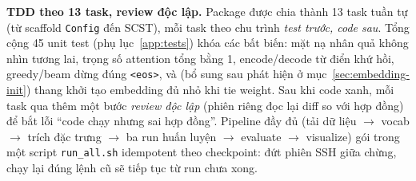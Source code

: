 \textbf{TDD theo 13 task, review độc lập.} Package được chia thành 13 task
tuần tự (từ scaffold \texttt{Config} đến SCST), mỗi task theo chu trình
\emph{test trước, code sau}. Tổng cộng 45 unit test (phụ lục~\ref{app:tests})
khóa các bất biến: mặt nạ nhân quả không nhìn tương lai, trọng số attention
tổng bằng 1, encode/decode từ điển khứ hồi, greedy/beam dừng đúng
\texttt{<eos>}, và (bổ sung sau phát hiện ở mục~\ref{sec:embedding-init})
thang khởi tạo embedding đủ nhỏ khi tie weight. Sau khi code xanh, mỗi task
qua thêm một bước \emph{review độc lập} (phiên riêng đọc lại diff so với hợp
đồng) để bắt lỗi ``code chạy nhưng sai hợp đồng''. Pipeline đầy đủ (tải dữ
liệu $\to$ vocab $\to$ trích đặc trưng $\to$ ba run huấn luyện $\to$ evaluate
$\to$ visualize) gói trong một script \texttt{run\_all.sh} idempotent theo
checkpoint: đứt phiên SSH giữa chừng, chạy lại đúng lệnh cũ sẽ tiếp tục từ run
chưa xong.
